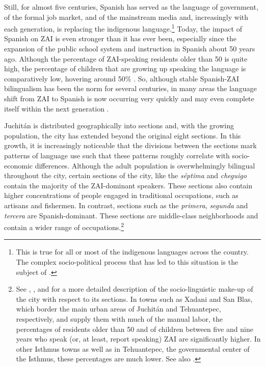 Still, for almost five centuries, Spanish has served as the language of government, of the formal job market, and of the mainstream media and, increasingly with each generation, is replacing the indigenous language.\footnote{This is true for all or most of the indigenous languages across the country. The complex socio-political process that has led to this situation is the subject of \citet{heath1972}.}  Today, the impact of Spanish on ZAI is even stronger than it has ever been, especially since the expansion of the public school system and instruction in Spanish about 50 years ago. Although the percentage of ZAI-speaking residents older than 50 is quite high, the percentage of children that are growing up speaking the language is comparatively low, hovering around 50\% \citep{augsburger2004}. So, although stable Spanish-ZAI bilingualism has been the norm for several centuries, in many areas the language shift from ZAI to Spanish is now occurring very quickly and may even complete itself within the next generation \citep{augsburger2004}.

Juchit\'{a}n is distributed geographically into sections and, with the growing population, the city has extended beyond the original eight sections. In this growth, it is increasingly noticeable that the divisions between the sections mark patterns of language use such that these patterns roughly correlate with socio-economic differences.  Although the adult population is overwhelmingly bilingual throughout the city, certain sections of the city, like the \textit{s\'{e}ptima} and \textit{cheguigo} contain the majority of the ZAI-dominant speakers. These sections also contain higher concentrations of people engaged in traditional occupations, such as artisans and fishermen. In contrast, sections such as the \textit{primera},  \textit{segunda} and  \textit{tercera} are Spanish-dominant. These sections are middle-class neighborhoods and contain a wider range of occupations.\footnote{See \citet{saynes2002}, \citet{augsburger2004}, and \citet[Chapter 1]{mccomsey2015} for a more detailed description of the socio-linguistic make-up of the city with respect to its sections. In towns such as Xadani and San Blas, which border the main urban areas of Juchit\'{a}n and Tehuantepec, respectively, and supply them with much of the manual labor, the percentages of residents older than 50 and of children between five and nine years who speak (or, at least, report speaking) ZAI are significantly higher. In other Isthmus towns as well as in Tehuantepec, the governmental center of the Isthmus, these percentages are much lower. See also \citet{toledo2018}.} 

